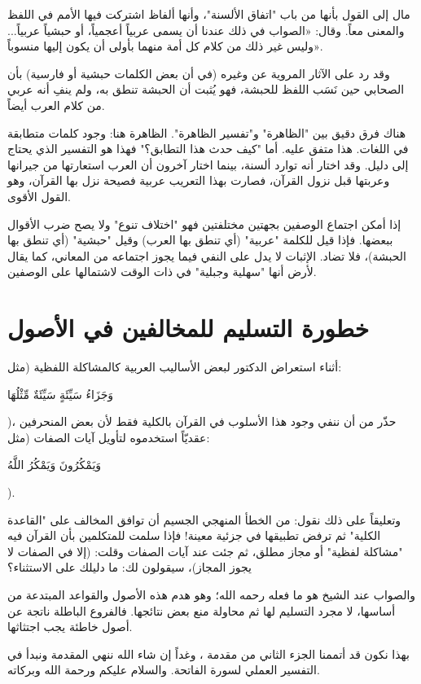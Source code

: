 مال  إلى القول بأنها من باب "اتفاق الألسنة"، وأنها ألفاظ اشتركت فيها الأمم في اللفظ والمعنى معاً. وقال: «الصواب في ذلك عندنا أن يسمى عربياً أعجمياً، أو حبشياً عربياً... وليس غير ذلك من كلام كل أمة منهما بأولى أن يكون إليها منسوباً».

وقد رد على الآثار المروية عن  وغيره (في أن بعض الكلمات حبشية أو فارسية) بأن الصحابي حين نَسَب اللفظ للحبشة، فهو يُثبت أن الحبشة تنطق به، ولم ينفِ أنه عربي من كلام العرب أيضاً.

\begin{fawaid}
هناك فرق دقيق بين "الظاهرة" و"تفسير الظاهرة". الظاهرة هنا: وجود كلمات متطابقة في اللغات. هذا متفق عليه. أما "كيف حدث هذا التطابق؟" فهذا هو التفسير الذي يحتاج إلى دليل. وقد اختار  أنه توارد ألسنة، بينما اختار آخرون أن العرب استعارتها من جيرانها وعربتها قبل نزول القرآن، فصارت بهذا التعريب عربية فصيحة نزل بها القرآن، وهو القول الأقوى.
\end{fawaid}

\begin{fawaid}
إذا أمكن اجتماع الوصفين بجهتين مختلفتين فهو "اختلاف تنوع" ولا يصح ضرب الأقوال ببعضها. فإذا قيل للكلمة "عربية" (أي تنطق بها العرب) وقيل "حبشية" (أي تنطق بها الحبشة)، فلا تضاد. الإثبات لا يدل على النفي فيما يجوز اجتماعه من المعاني، كما يقال لأرض أنها "سهلية وجبلية" في ذات الوقت لاشتمالها على الوصفين.
\end{fawaid}

\separator

\section{خطورة التسليم للمخالفين في الأصول}
أثناء استعراض الدكتور  لبعض الأساليب العربية كالمشاكلة اللفظية (مثل: \begin{ayah}وَجَزَاءُ سَيِّئَةٍ سَيِّئَةٌ مِّثْلُهَا\end{ayah})، حذّر من أن ننفي وجود هذا الأسلوب في القرآن بالكلية فقط لأن بعض المنحرفين عقديّاً استخدموه لتأويل آيات الصفات (مثل: \begin{ayah}وَيَمْكُرُونَ وَيَمْكُرُ اللَّهُ\end{ayah}).

وتعليقاً على ذلك نقول: من الخطأ المنهجي الجسيم أن توافق المخالف على "القاعدة الكلية" ثم ترفض تطبيقها في جزئية معينة! 
فإذا سلمت للمتكلمين بأن القرآن فيه "مشاكلة لفظية" أو مجاز مطلق، ثم جئت عند آيات الصفات وقلت: (إلا في الصفات لا يجوز المجاز)، سيقولون لك: ما دليلك على الاستثناء؟

والصواب عند الشيخ هو ما فعله  رحمه الله؛ وهو هدم هذه الأصول والقواعد المبتدعة من أساسها، لا مجرد التسليم لها ثم محاولة منع بعض نتائجها. فالفروع الباطلة ناتجة عن أصول خاطئة يجب اجتثاثها.

\separator

بهذا نكون قد أتممنا الجزء الثاني من مقدمة ، وغداً إن شاء الله ننهي المقدمة ونبدأ في التفسير العملي لسورة الفاتحة. والسلام عليكم ورحمة الله وبركاته.

